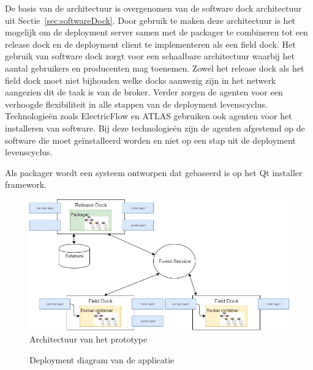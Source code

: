 De basis van de architectuur is overgenomen van de software dock architectuur uit Sectie~\ref{sec:softwareDock}.
Door gebruik te maken deze architectuur is het mogelijk om de deployment server samen met de packager te combineren tot een release dock en de deployment client te implementeren als een field dock. 
Het gebruik van software dock zorgt voor een schaalbare architectuur waarbij het aantal gebruikers en producenten mag toenemen.
Zowel het release dock als het field dock moet niet bijhouden welke docks aanwezig zijn in het netwerk aangezien dit de taak is van de broker.
Verder zorgen de agenten voor een verhoogde flexibiliteit in alle stappen van de deployment levenscyclus.
Technologieën zoals ElectricFlow en ATLAS gebruiken ook agenten voor het installeren van software.
Bij deze technologieën zijn de agenten afgestemd op de software die moet geïnstalleerd worden en niet op een stap uit de deployment levenscyclus.

Als packager wordt een systeem ontworpen dat gebaseerd is op het Qt installer framework.
 

\begin{figure}
\includegraphics[width=\textwidth,height=\textheight,keepaspectratio]{afbeelding/architectuur.png}
\centering
\caption{Architectuur van het prototype}
\label{fig:architectuur}
\end{figure}

\begin{figure}[!ht]
\centering
{}
\caption{Deployment diagram van de applicatie}
\label{fig:deploymentDiagram}
\end{figure}

